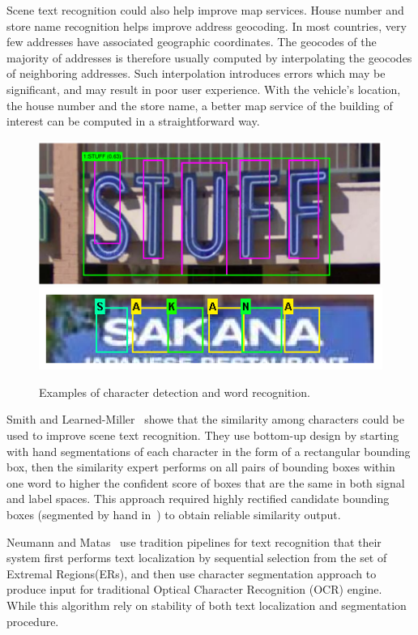 \documentclass[10pt,twocolumn,letterpaper]{article}
\begin{document}
Scene text recognition could also help improve map services. House number and store name recognition helps improve address geocoding. In most countries, very few addresses have associated geographic coordinates. The geocodes of the majority of addresses is therefore usually computed by interpolating the geocodes of neighboring addresses. Such interpolation introduces errors which may be significant, and may result in poor user experience. With the vehicle's location, the house number and the store name, a better map service of the building of interest can be computed in a straightforward way.

\begin{figure}[t]
\begin{center}
\includegraphics[width=1\linewidth]{fig/p1}
\includegraphics[width=1\linewidth]{fig/p10}
\end{center}
   \caption{Examples of character detection and word recognition.}
\label{fig:sample1}
\end{figure}

Smith and Learned-Miller~\cite{118} showe that the similarity among characters could be used to improve scene text recognition. They use bottom-up design by starting with hand segmentations of each character in the form of a rectangular bounding box, then the similarity expert performs on all pairs of bounding boxes within one word to higher the confident score of boxes that are the same in both signal and label spaces. This approach required highly rectified candidate bounding boxes (segmented by hand in~\cite{118}) to obtain reliable similarity output.

Neumann and Matas~\cite{120,119} use tradition pipelines for text recognition that their system first performs text localization by sequential selection from the set of Extremal Regions(ERs), and then use character segmentation approach to produce input for traditional Optical Character Recognition (OCR) engine. While this algorithm rely on stability of both text localization and segmentation procedure.
\end{document}
